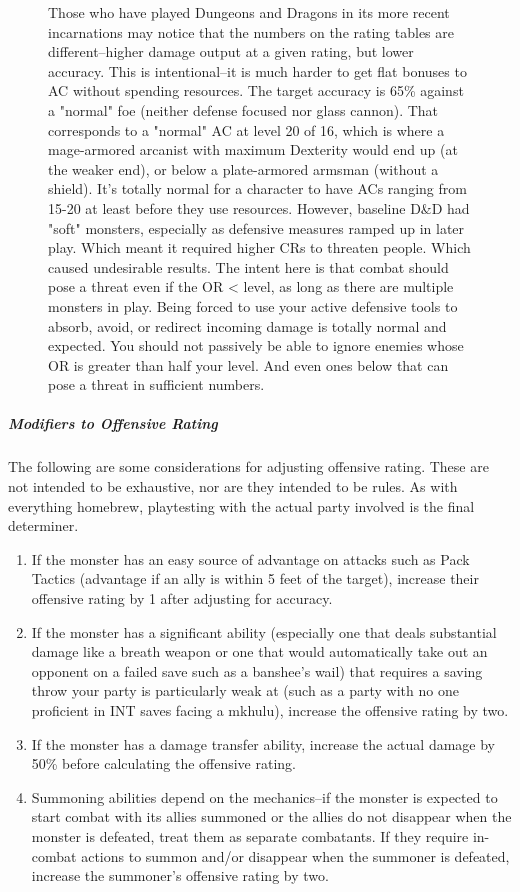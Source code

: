 \begin{figure}
	\begin{DndComment}
		Those who have played Dungeons and Dragons in its more recent incarnations may notice that the numbers on the rating tables are different--higher damage output at a given rating, but lower accuracy. This is intentional--it is much harder to get flat bonuses to AC without spending resources. The target accuracy is 65\% against a "normal" foe (neither defense focused nor glass cannon). That corresponds to a "normal" AC at level 20 of 16, which is where a mage-armored arcanist with maximum Dexterity would end up (at the weaker end), or below a plate-armored armsman (without a shield). It's totally normal for a character to have ACs ranging from 15-20 at least before they use resources. However, baseline D\&D had "soft" monsters, especially as defensive measures ramped up in later play. Which meant it required higher CRs to threaten people. Which caused undesirable results. The intent here is that combat should pose a threat even if the OR < level, as long as there are multiple monsters in play. Being forced to use your active defensive tools to absorb, avoid, or redirect incoming damage is totally normal and expected. You should not passively be able to ignore enemies whose OR is greater than half your level. And even ones below that can pose a threat in sufficient numbers.
	\end{DndComment}
\end{figure}

\subparagraph*{Modifiers to Offensive Rating}
The following are some considerations for adjusting offensive rating. These are not intended to be exhaustive, nor are they intended to be rules. As with everything homebrew, playtesting with the actual party involved is the final determiner.
\begin{enumerate}
	\item If the monster has an easy source of advantage on attacks such as Pack Tactics (advantage if an ally is within 5 feet of the target), increase their offensive rating by 1 after adjusting for accuracy.
	\item If the monster has a significant ability (especially one that deals substantial damage like a breath weapon or one that would automatically take out an opponent on a failed save such as a banshee's wail) that requires a saving throw your party is particularly weak at (such as a party with no one proficient in INT saves facing a mkhulu), increase the offensive rating by two.
	\item If the monster has a damage transfer ability, increase the actual damage by 50\% before calculating the offensive rating.
	\item Summoning abilities depend on the mechanics--if the monster is expected to start combat with its allies summoned or the allies do not disappear when the monster is defeated, treat them as separate combatants. If they require in-combat actions to summon and/or disappear when the summoner is defeated, increase the summoner's offensive rating by two.
\end{enumerate}

